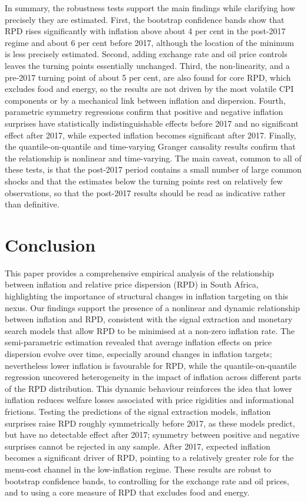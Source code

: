 \documentclass[
  letterpaper,
  DIV=11,
  numbers=noendperiod]{scrartcl}
\begin{document}
In summary, the robustness tests support the main findings while
clarifying how precisely they are estimated. First, the bootstrap
confidence bands show that RPD rises significantly with inflation above
about 4 per cent in the post-2017 regime and about 6 per cent before
2017, although the location of the minimum is less precisely estimated.
Second, adding exchange rate and oil price controls leaves the turning
points essentially unchanged. Third, the non-linearity, and a pre-2017
turning point of about 5 per cent, are also found for core RPD, which
excludes food and energy, so the results are not driven by the most
volatile CPI components or by a mechanical link between inflation and
dispersion. Fourth, parametric symmetry regressions confirm that
positive and negative inflation surprises have statistically
indistinguishable effects before 2017 and no significant effect after
2017, while expected inflation becomes significant after 2017. Finally,
the quantile-on-quantile and time-varying Granger causality results
confirm that the relationship is nonlinear and time-varying. The main
caveat, common to all of these tests, is that the post-2017 period
contains a small number of large common shocks and that the estimates
below the turning points rest on relatively few observations, so that
the post-2017 results should be read as indicative rather than
definitive.

\section{Conclusion}\label{conclusion}

This paper provides a comprehensive empirical analysis of the
relationship between inflation and relative price dispersion (RPD) in
South Africa, highlighting the importance of structural changes in
inflation targeting on this nexus. Our findings support the presence of
a nonlinear and dynamic relationship between inflation and RPD,
consistent with the signal extraction and monetary search models that
allow RPD to be minimised at a non-zero inflation rate. The
semi-parametric estimation revealed that average inflation effects on
price dispersion evolve over time, especially around changes in
inflation targets; nevertheless lower inflation is favourable for RPD,
while the quantile-on-quantile regression uncovered heterogeneity in the
impact of inflation across different parts of the RPD distribution. This
dynamic behaviour reinforces the idea that lower inflation reduces
welfare losses associated with price rigidities and informational
frictions. Testing the predictions of the signal extraction models,
inflation surprises raise RPD roughly symmetrically before 2017, as
these models predict, but have no detectable effect after 2017; symmetry
between positive and negative surprises cannot be rejected in any
sample. After 2017, expected inflation becomes a significant driver of
RPD, pointing to a relatively greater role for the menu-cost channel in
the low-inflation regime. These results are robust to bootstrap
confidence bands, to controlling for the exchange rate and oil prices,
and to using a core measure of RPD that excludes food and energy.
\end{document}
